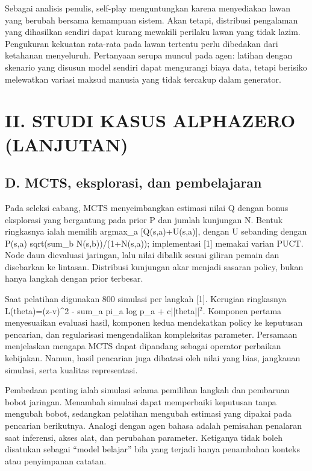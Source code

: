 \documentclass[conference,a4paper]{IEEEtran}
\begin{document}
Sebagai analisis penulis, self-play menguntungkan karena menyediakan lawan yang berubah bersama kemampuan sistem. Akan tetapi, distribusi pengalaman yang dihasilkan sendiri dapat kurang mewakili perilaku lawan yang tidak lazim. Pengukuran kekuatan rata-rata pada lawan tertentu perlu dibedakan dari ketahanan menyeluruh. Pertanyaan serupa muncul pada agen: latihan dengan skenario yang disusun model sendiri dapat mengurangi biaya data, tetapi berisiko melewatkan variasi maksud manusia yang tidak tercakup dalam generator.

\clearpage
\section*{II. STUDI KASUS ALPHAZERO (LANJUTAN)}
\subsection*{D. MCTS, eksplorasi, dan pembelajaran}
Pada seleksi cabang, MCTS menyeimbangkan estimasi nilai Q dengan bonus eksplorasi yang bergantung pada prior P dan jumlah kunjungan N. Bentuk ringkasnya ialah memilih argmax\_a [Q(s,a)+U(s,a)], dengan U sebanding dengan P(s,a) sqrt(sum\_b N(s,b))/(1+N(s,a)); implementasi [1] memakai varian PUCT. Node daun dievaluasi jaringan, lalu nilai dibalik sesuai giliran pemain dan disebarkan ke lintasan. Distribusi kunjungan akar menjadi sasaran policy, bukan hanya langkah dengan prior terbesar.

Saat pelatihan digunakan 800 simulasi per langkah [1]. Kerugian ringkasnya L(theta)=(z-v)\textasciicircum{}2 - sum\_a pi\_a log p\_a + c||theta||$^2$. Komponen pertama menyesuaikan evaluasi hasil, komponen kedua mendekatkan policy ke keputusan pencarian, dan regularisasi mengendalikan kompleksitas parameter. Persamaan menjelaskan mengapa MCTS dapat dipandang sebagai operator perbaikan kebijakan. Namun, hasil pencarian juga dibatasi oleh nilai yang bias, jangkauan simulasi, serta kualitas representasi.

Pembedaan penting ialah simulasi selama pemilihan langkah dan pembaruan bobot jaringan. Menambah simulasi dapat memperbaiki keputusan tanpa mengubah bobot, sedangkan pelatihan mengubah estimasi yang dipakai pada pencarian berikutnya. Analogi dengan agen bahasa adalah pemisahan penalaran saat inferensi, akses alat, dan perubahan parameter. Ketiganya tidak boleh disatukan sebagai ``model belajar'' bila yang terjadi hanya penambahan konteks atau penyimpanan catatan.
\end{document}

